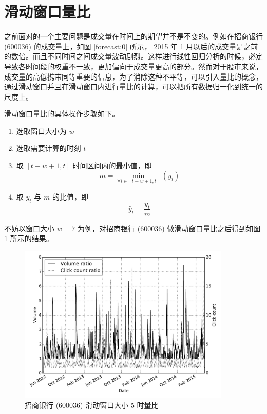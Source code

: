 \section{滑动窗口量比}

之前面对的一个主要问题是成交量在时间上的期望并不是不变的。例如在招商银行 (600036) 的成交量上，如图 \ref{forecast:0} 所示， 2015 年 1 月以后的成交量是之前的数倍。而且不同时间之间成交量波动剧烈。这样进行线性回归分析的时候，必定导致各时间段的权重不一致，更加偏向于成交量更高的部分。然而对于股市来说，成交量的高低携带同等重要的信息，为了消除这种不平等，可以引入量比的概念，通过滑动窗口并且在滑动窗口内进行量比的计算，可以把所有数据归一化到统一的尺度上。

滑动窗口量比的具体操作步骤如下。

\begin{enumerate}
  \item 选取窗口大小为 $w$
  \item 选取需要计算的时刻 $t$
  \item 取 $[t-w+1,t]$ 时间区间内的最小值，即
    \[
      m=\min_{\forall i\in [t-w+1,t]}\left(y_{i}\right)
    \]
  \item 取 $y_{t}$ 与 $m$ 的比值，即
    \[
      \hat{y}_{t}=\frac{y_{t}}{m}
    \]
\end{enumerate}

不妨以窗口大小 $w=7$ 为例，对招商银行 (600036) 做滑动窗口量比之后得到如图 \ref{sliding_window:0} 所示的结果。

\begin{figure}
  \centering
  \includegraphics[width=0.9\textwidth]{plots/sliding_ratio_line.pdf}
  \caption{招商银行 (600036) 滑动窗口大小 $5$ 时量比}
  \label{sliding_window:0}
\end{figure}

